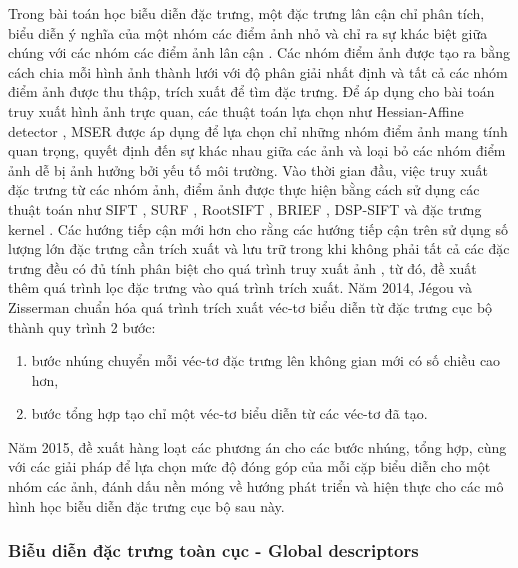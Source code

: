 Trong bài toán học biễu diễn đặc trưng, một đặc trưng lân cận chỉ phân tích, biểu diễn ý nghĩa của một nhóm các điểm ảnh nhỏ và chỉ ra sự khác biệt giữa chúng với các nhóm các điểm ảnh lân cận \cite{CGV-017-localdescriptors}. Các nhóm điểm ảnh được tạo ra bằng cách chia mỗi hình ảnh thành lưới với độ phân giải nhất định và tất cả các nhóm điểm ảnh được thu thập, trích xuất để tìm đặc trưng. Để áp dụng cho bài toán truy xuất hình ảnh trực quan, các thuật toán lựa chọn như Hessian-Affine detector \cite{hessian-affine-detector}, MSER\cite{MSER-detector} được áp dụng để lựa chọn chỉ những nhóm điểm ảnh mang tính quan trọng, quyết định đến sự khác nhau giữa các ảnh và loại bỏ các nhóm điểm ảnh dễ bị ảnh hưởng bởi yếu tố môi trường. Vào thời gian đầu, việc truy xuất đặc trưng từ các nhóm ảnh, điểm ảnh được thực hiện bằng cách sử dụng các thuật toán như SIFT \cite{lowe1999object}, SURF \cite{bay2006surf}, RootSIFT \cite{Arandjelovi2012ThreeTE}, BRIEF \cite{brief}, DSP-SIFT \cite{Dong2014DomainsizePI} và đặc trưng kernel \cite{kernel-descriptors}. Các hướng tiếp cận mới hơn cho rằng các hướng tiếp cận trên sử dụng số lượng lớn đặc trưng cần trích xuất và lưu trữ trong khi không phải tất cả các đặc trưng đều có đủ tính phân biệt cho quá trình truy xuất ảnh \cite{predicting-good-features}, từ đó, đề xuất thêm quá trình lọc đặc trưng vào quá trình trích xuất. Năm 2014, Jégou và Zisserman chuẩn hóa quá trình trích xuất véc-tơ biểu diễn từ đặc trưng cục bộ thành quy trình 2 bước\cite{Jegou_2014_CVPR}:
\begin{enumerate}
    \item bước nhúng chuyển mỗi véc-tơ đặc trưng lên không gian mới có số chiều cao hơn,
    \item bước tổng hợp tạo chỉ một véc-tơ biểu diễn từ các véc-tơ đã tạo.
\end{enumerate}
Năm 2015, \cite{selective-match-kernel} đề xuất hàng loạt các phương án cho các bước nhúng, tổng hợp, cùng với các giải pháp để lựa chọn mức độ đóng góp của mỗi cặp biểu diễn cho một nhóm các ảnh, đánh dấu nền móng về hướng phát triển và hiện thực cho các mô hình học biễu diễn đặc trưng cục bộ sau này.

\subsubsection{Biễu diễn đặc trưng toàn cục  - Global descriptors}

